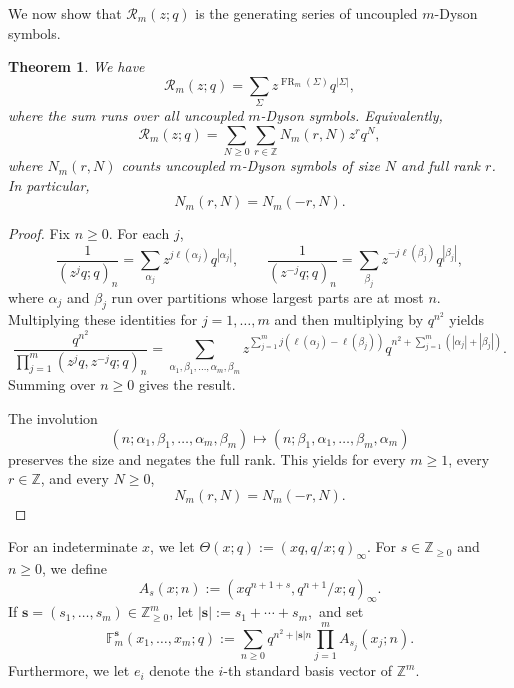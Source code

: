\documentclass[12pt]{amsart}
\numberwithin{equation}{section}
\newtheorem{theorem}{Theorem}[section]
\newcommand{\ZZ}{\mathbb Z}
\newcommand{\FF}{\mathbb F}
\begin{document}
We now show that $\mathcal{R}_m(z;q)$ is the generating series of uncoupled $m$-Dyson symbols.
\begin{theorem}\label{thm:combinatorialgenseries}
We have
\[
\mathcal{R}_m(z;q)=\sum_{\Sigma} z^{\operatorname{FR}_m(\Sigma)}q^{|\Sigma|},
\]
where the sum runs over all uncoupled $m$-Dyson symbols. Equivalently,
\[
\mathcal{R}_m(z;q)=\sum_{N\ge 0}\sum_{r\in\ZZ} N_m(r,N)z^rq^N,
\]
where $N_m(r,N)$ counts uncoupled $m$-Dyson symbols of size $N$ and full rank $r$. In particular,
\[
N_m(r,N)=N_m(-r,N).
\]
\end{theorem}
\begin{proof}
Fix $n\ge 0$. For each $j$,
\[
\frac{1}{(z^jq;q)_n}=\sum_{\alpha_j} z^{j\ell(\alpha_j)}q^{|\alpha_j|},
\qquad
\frac{1}{(z^{-j}q;q)_n}=\sum_{\beta_j} z^{-j\ell(\beta_j)}q^{|\beta_j|},
\]
where $\alpha_j$ and $\beta_j$ run over partitions whose largest parts are at most $n$. Multiplying these identities for $j=1,\dots,m$ and then multiplying by $q^{n^2}$ yields
\[
\frac{q^{n^2}}{\prod_{j=1}^m (z^jq,z^{-j}q;q)_n}
=
\sum_{\alpha_1,\beta_1,\dots,\alpha_m,\beta_m}
 z^{\sum_{j=1}^m j(\ell(\alpha_j)-\ell(\beta_j))}
 q^{n^2+\sum_{j=1}^m(|\alpha_j|+|\beta_j|)}.
\]
Summing over $n\ge 0$ gives the result.

The involution
\[
(n;\alpha_1,\beta_1,\dots,\alpha_m,\beta_m)
\longmapsto
(n;\beta_1,\alpha_1,\dots,\beta_m,\alpha_m)
\]
preserves the size and negates the full rank. This yields for every $m\ge 1$, every $r\in\ZZ$, and every $N\ge 0$,
\[
N_m(r,N)=N_m(-r,N).
\]
\end{proof}


For an indeterminate $x$, we let $\Theta(x;q):=(xq,q/x;q)_\infty$.
For $s\in\ZZ_{\ge 0}$ and $n\ge 0$, we define
\[
A_s(x;n):=(xq^{n+1+s},q^{n+1}/x;q)_\infty.
\]
If $\mathbf s=(s_1,\dots,s_m)\in\ZZ_{\ge 0}^m$, let
$
|\mathbf s|:=s_1+\cdots+s_m,
$
and set
\[
\FF_m^{\mathbf s}(x_1,\dots,x_m;q):=\sum_{n\ge 0} q^{n^2+|\mathbf s|n}\prod_{j=1}^m A_{s_j}(x_j;n).
\]
Furthermore, we let \(e_i\) denote the \(i\)-th standard basis vector of \(\mathbb Z^m\).
\end{document}
